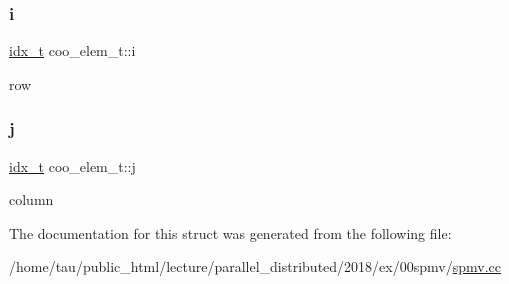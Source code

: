 \subsubsection{\texorpdfstring{i}{i}}
{\footnotesize\ttfamily \hyperlink{spmv_8cc_a8e93478a00e685bea5e6a3f617bf03a3}{idx\+\_\+t} coo\+\_\+elem\+\_\+t\+::i}

row \mbox{\label{structcoo__elem__t_a45a4cd1c7ffe70ddd75dff7c764bbfc6}} 
\subsubsection{\texorpdfstring{j}{j}}
{\footnotesize\ttfamily \hyperlink{spmv_8cc_a8e93478a00e685bea5e6a3f617bf03a3}{idx\+\_\+t} coo\+\_\+elem\+\_\+t\+::j}

column 

The documentation for this struct was generated from the following file\+:\begin{DoxyCompactItemize}
\item 
/home/tau/public\+\_\+html/lecture/parallel\+\_\+distributed/2018/ex/00spmv/\hyperlink{spmv_8cc}{spmv.\+cc}\end{DoxyCompactItemize}
